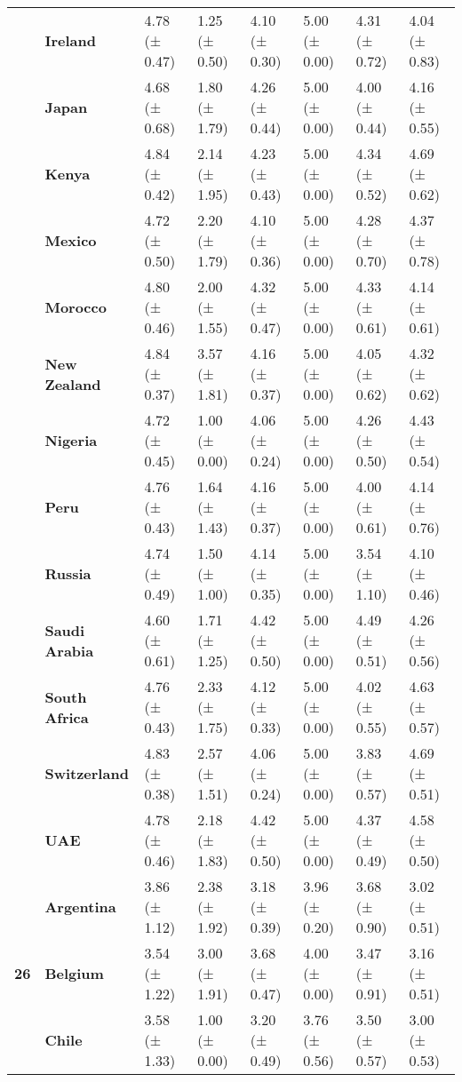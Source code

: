 \begin{tabular}{llllllll}
\textbf{} & \textbf{Ireland} & 4.78 (± 0.47) & 1.25 (± 0.50) & 4.10 (± 0.30) & 5.00 (± 0.00) & 4.31 (± 0.72) & 4.04 (± 0.83) \\
\textbf{} & \textbf{Japan} & 4.68 (± 0.68) & 1.80 (± 1.79) & 4.26 (± 0.44) & 5.00 (± 0.00) & 4.00 (± 0.44) & 4.16 (± 0.55) \\
\textbf{} & \textbf{Kenya} & 4.84 (± 0.42) & 2.14 (± 1.95) & 4.23 (± 0.43) & 5.00 (± 0.00) & 4.34 (± 0.52) & 4.69 (± 0.62) \\
\textbf{} & \textbf{Mexico} & 4.72 (± 0.50) & 2.20 (± 1.79) & 4.10 (± 0.36) & 5.00 (± 0.00) & 4.28 (± 0.70) & 4.37 (± 0.78) \\
\textbf{} & \textbf{Morocco} & 4.80 (± 0.46) & 2.00 (± 1.55) & 4.32 (± 0.47) & 5.00 (± 0.00) & 4.33 (± 0.61) & 4.14 (± 0.61) \\
\textbf{} & \textbf{New Zealand} & 4.84 (± 0.37) & 3.57 (± 1.81) & 4.16 (± 0.37) & 5.00 (± 0.00) & 4.05 (± 0.62) & 4.32 (± 0.62) \\
\textbf{} & \textbf{Nigeria} & 4.72 (± 0.45) & 1.00 (± 0.00) & 4.06 (± 0.24) & 5.00 (± 0.00) & 4.26 (± 0.50) & 4.43 (± 0.54) \\
\textbf{} & \textbf{Peru} & 4.76 (± 0.43) & 1.64 (± 1.43) & 4.16 (± 0.37) & 5.00 (± 0.00) & 4.00 (± 0.61) & 4.14 (± 0.76) \\
\textbf{} & \textbf{Russia} & 4.74 (± 0.49) & 1.50 (± 1.00) & 4.14 (± 0.35) & 5.00 (± 0.00) & 3.54 (± 1.10) & 4.10 (± 0.46) \\
\textbf{} & \textbf{Saudi Arabia} & 4.60 (± 0.61) & 1.71 (± 1.25) & 4.42 (± 0.50) & 5.00 (± 0.00) & 4.49 (± 0.51) & 4.26 (± 0.56) \\
\textbf{} & \textbf{South Africa} & 4.76 (± 0.43) & 2.33 (± 1.75) & 4.12 (± 0.33) & 5.00 (± 0.00) & 4.02 (± 0.55) & 4.63 (± 0.57) \\
\textbf{} & \textbf{Switzerland} & 4.83 (± 0.38) & 2.57 (± 1.51) & 4.06 (± 0.24) & 5.00 (± 0.00) & 3.83 (± 0.57) & 4.69 (± 0.51) \\
\textbf{} & \textbf{UAE} & 4.78 (± 0.46) & 2.18 (± 1.83) & 4.42 (± 0.50) & 5.00 (± 0.00) & 4.37 (± 0.49) & 4.58 (± 0.50) \\
\cline{1-8}
\multirow[t]{19}{*}{\textbf{26}} & \textbf{Argentina} & 3.86 (± 1.12) & 2.38 (± 1.92) & 3.18 (± 0.39) & 3.96 (± 0.20) & 3.68 (± 0.90) & 3.02 (± 0.51) \\
\textbf{} & \textbf{Belgium} & 3.54 (± 1.22) & 3.00 (± 1.91) & 3.68 (± 0.47) & 4.00 (± 0.00) & 3.47 (± 0.91) & 3.16 (± 0.51) \\
\textbf{} & \textbf{Chile} & 3.58 (± 1.33) & 1.00 (± 0.00) & 3.20 (± 0.49) & 3.76 (± 0.56) & 3.50 (± 0.57) & 3.00 (± 0.53) \\

\end{tabular}
